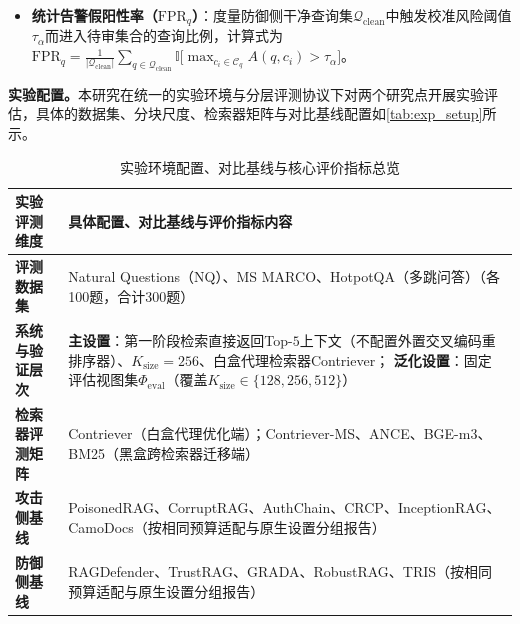 \begin{itemize}[leftmargin=2em,itemsep=2pt]
  \item \textbf{统计告警假阳性率（$\mathrm{FPR}_q$）}：度量防御侧干净查询集$\mathcal Q_{\mathrm{clean}}$中触发校准风险阈值$\tau_\alpha$而进入待审集合的查询比例，计算式为 $\mathrm{FPR}_q=\frac{1}{|\mathcal Q_{\mathrm{clean}}|}\sum_{q\in\mathcal Q_{\mathrm{clean}}}\mathbb I\big[\max_{c_i\in\mathcal C_q}A(q,c_i)>\tau_\alpha\big]$。
\end{itemize}

\textbf{实验配置。}本研究在统一的实验环境与分层评测协议下对两个研究点开展实验评估，具体的数据集、分块尺度、检索器矩阵与对比基线配置如\autoref{tab:exp_setup}所示。

\begin{table}[H]
  \centering
  \small
  \caption{实验环境配置、对比基线与核心评价指标总览}
  \label{tab:exp_setup}
  \begin{tabularx}{\textwidth}{>{\bfseries}p{2.7cm} X}
    \toprule
    实验评测维度 & 具体配置、对比基线与评价指标内容 \\
    \midrule
    评测数据集 & Natural Questions（NQ）\cite{kwiatkowski-etal-2019-natural}、MS MARCO\cite{bajaj2018msmarcohumangenerated}、HotpotQA（多跳问答）\cite{yang-etal-2018-hotpotqa}（各100题，合计300题） \\
    系统与验证层次 & \textbf{主设置}：第一阶段检索直接返回Top-$5$上下文（不配置外置交叉编码重排序器）、$K_{\mathrm{size}}=256$、白盒代理检索器Contriever\cite{izacard2022unsupervised}；\newline
    \textbf{泛化设置}：固定评估视图集$\Phi_{\mathrm{eval}}$（覆盖$K_{\mathrm{size}}\in\{128, 256, 512\}$） \\
    检索器评测矩阵 & Contriever（白盒代理优化端）\cite{izacard2022unsupervised}；Contriever-MS、ANCE\cite{xiong2021approximate}、BGE-m3\cite{chen2024m3}、BM25\cite{robertson2009probabilistic}（黑盒跨检索器迁移端） \\
    攻击侧基线 & PoisonedRAG\cite{zou2025poisonedrag}、CorruptRAG\cite{zhang2026corruptrag}、AuthChain\cite{chang2025oneshot}、CRCP\cite{nie2026crcp}、InceptionRAG\cite{zhang2026inceptionrag}、CamoDocs\cite{jung2026camodocs}（按相同预算适配与原生设置分组报告） \\
    防御侧基线 & RAGDefender\cite{kim2025ragdefender}、TrustRAG\cite{zhou2025trustrag}、GRADA\cite{zheng2025grada}、RobustRAG\cite{xiang2024certifiably}、TRIS\cite{munir2026tris}（按相同预算适配与原生设置分组报告） \\
    \bottomrule
  \end{tabularx}
\end{table}

